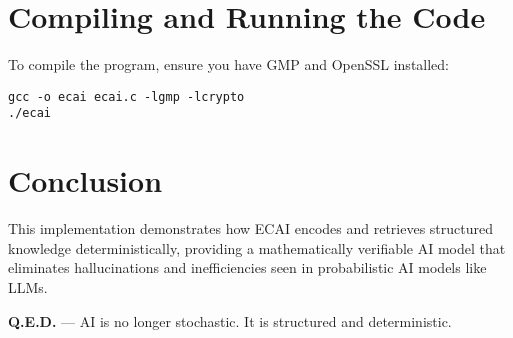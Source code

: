 \documentclass{article}
\begin{document}
\section{Compiling and Running the Code}
To compile the program, ensure you have GMP and OpenSSL installed:

\begin{verbatim}
gcc -o ecai ecai.c -lgmp -lcrypto
./ecai
\end{verbatim}

\section{Conclusion}
This implementation demonstrates how ECAI encodes and retrieves structured knowledge deterministically, providing a mathematically verifiable AI model that eliminates hallucinations and inefficiencies seen in probabilistic AI models like LLMs.

\textbf{Q.E.D.} — AI is no longer stochastic. It is structured and deterministic.
\end{document}
